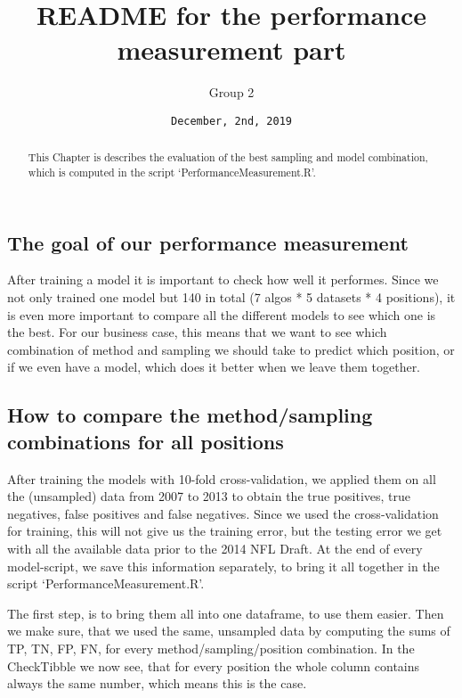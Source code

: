 \documentclass[]{article}
\title{README for the performance measurement part}
\author{Group 2}
\date{\texttt{December,\ 2nd,\ 2019}}
\begin{document}
\maketitle
\begin{abstract}
This Chapter is describes the evaluation of the best sampling and model
combination, which is computed in the script `PerformanceMeasurement.R'.
\end{abstract}

\hypertarget{the-goal-of-our-performance-measurement}{%
\subsection{The goal of our performance
measurement}\label{the-goal-of-our-performance-measurement}}

After training a model it is important to check how well it performes.
Since we not only trained one model but 140 in total (7 algos * 5
datasets * 4 positions), it is even more important to compare all the
different models to see which one is the best. For our business case,
this means that we want to see which combination of method and sampling
we should take to predict which position, or if we even have a model,
which does it better when we leave them together.

\hypertarget{how-to-compare-the-methodsampling-combinations-for-all-positions}{%
\subsection{How to compare the method/sampling combinations for all
positions}\label{how-to-compare-the-methodsampling-combinations-for-all-positions}}

After training the models with 10-fold cross-validation, we applied them
on all the (unsampled) data from 2007 to 2013 to obtain the true
positives, true negatives, false positives and false negatives. Since we
used the cross-validation for training, this will not give us the
training error, but the testing error we get with all the available data
prior to the 2014 NFL Draft. At the end of every model-script, we save
this information separately, to bring it all together in the script
`PerformanceMeasurement.R'.

The first step, is to bring them all into one dataframe, to use them
easier. Then we make sure, that we used the same, unsampled data by
computing the sums of TP, TN, FP, FN, for every method/sampling/position
combination. In the CheckTibble we now see, that for every position the
whole column contains always the same number, which means this is the
case.
\end{document}
